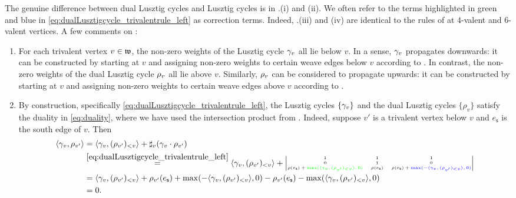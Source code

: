 \noindent The genuine difference between dual Lusztig cycles and Lusztig cycles is in .(i) and (ii). We often refer to the terms highlighted in green and blue in \eqref{eq:dualLusztigcycle_trivalentrule_left} as correction terms. Indeed, .(iii) and (iv) are identical to the rules of  at 4-valent and 6-valent vertices. A few comments on :

\begin{enumerate}
    \item For each trivalent vertex $v\in\mathfrak{w}$, the non-zero weights of the Lusztig cycle $\gamma_v$ all lie below $v$. In a sense, $\gamma_v$ propagates downwards: it can be constructed by starting at $v$ and assigning non-zero weights to certain weave edges below $v$ according to . In contrast, the non-zero weights of the dual Lusztig cycle $\rho_v$ all lie above $v$. Similarly, $\rho_v$ can be considered to propagate upwards: it can be constructed by starting at $v$ and assigning non-zero weights to certain weave edges above $v$ according to .\\

    \item By construction, specifically \eqref{eq:dualLusztigcycle_trivalentrule_left}, the Lusztig cycles $\{\gamma_v\}$ and the dual Lusztig cycles $\{\rho_v\}$ satisfy the duality in \eqref{eq:duality},  where we have used the intersection product from . Indeed, suppose $v'$ is a trivalent vertex below $v$ and $e_\mathsf{s}$ is the south edge of $v$. Then
    \begin{equation*}
\begin{split}
\langle \gamma_v,\rho_{v'}\rangle & = \langle \gamma_v,(\rho_{v'})_{<v}\rangle+\sharp_{v}(\gamma_v \cdot \rho_{v'}) \\
  & \stackrel{\eqref{eq:dualLusztigcycle_trivalentrule_left}}{=} \langle \gamma_v,(\rho_{v'})_{<v}\rangle+\left|
\tiny\begin{matrix}
1 & 1 & 1\\
0 & 1 & 0\\
\rho(e_\mathsf{s})+\textcolor{green}{\max(\langle \gamma_v,(\rho_{v'})_{<v}\rangle,0)} & \rho(e_\mathsf{s}) & \rho(e_\mathsf{s})+\textcolor{blue}{\max(-\langle \gamma_v,(\rho_{v'})_{<v}\rangle,0)}\\
\end{matrix}
\right|\\
\normalsize
 & = \langle \gamma_v,(\rho_{v'})_{<v}\rangle+\rho_{v'}(e_\mathsf{s})+\max(-\langle \gamma_v,(\rho_{v'})_{<v}\rangle,0) - \rho_{v'}(e_\mathsf{s})-\max(\langle \gamma_v,(\rho_{v'})_{<v}\rangle,0)\\
 & = 0.
\end{split}
\end{equation*}
    

\end{enumerate}

